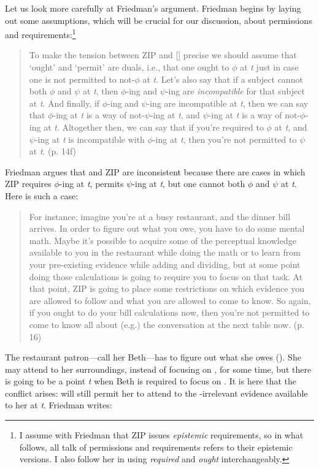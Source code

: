 \documentclass[12pt]{article}
\begin{document}
Let us look more carefully at Friedman’s argument. Friedman begins by laying out some assumptions, which will be crucial for our discussion, about permissions and requirements:\footnote{I assume with Friedman that ZIP issues \textit{epistemic} requirements, so in what follows, all talk of permissions and requirements refers to their epistemic versions. I also follow her in using \textit{required} and \textit{ought} interchangeably.}

\begin{quote}
    To make the tension between ZIP and [\ep{}] precise we should assume that `ought' and `permit' are duals, i.e., that one ought to $\phi$ at \textit{t} just in case one is not permitted to not-$\phi$ at \textit{t}. Let's also say that if a subject cannot both $\phi$ and $\psi$ at \textit{t}, then $\phi$-ing and $\psi$-ing are \textit{incompatible} for that subject at \textit{t}. And finally, if $\phi$-ing and $\psi$-ing are incompatible at \textit{t}, then we can say that $\phi$-ing at \textit{t} is a way of not-$\psi$-ing at \textit{t}, and $\psi$-ing at \textit{t} is a way of not-$\phi$-ing at \textit{t}. Altogether then, we can say that if you're required to $\phi$ at \textit{t}, and $\psi$-ing at \textit{t} is incompatible with $\phi$-ing at \textit{t}, then you're not permitted to $\psi$ at \textit{t}. (p. 14f)
\end{quote}
%
Friedman argues that \ep{} and ZIP are inconsistent because there are cases in which ZIP requires $\phi$-ing at \textit{t}, \ep{} permits $\psi$-ing at \textit{t}, but one cannot both $\phi$ and $\psi$ at \textit{t}. Here is such a case:

\begin{quote}
    For instance, imagine you're at a busy restaurant, and the dinner bill arrives. In order to figure out what you owe, you have to do some mental math. Maybe it’s possible to acquire some of the perceptual knowledge available to you in the restaurant while doing the math or to learn from your pre-existing evidence while adding and dividing, but at some point doing those calculations is going to require you to focus on that task. At that point, ZIP is going to place some restrictions on which evidence you are allowed to follow and what you are allowed to come to know. So again, if you ought to do your bill calculations now, then you’re not permitted to come to know all about (e.g.) the conversation at the next table now. (p. 16)
\end{quote}
%
The restaurant patron---call her Beth---has to figure out what she owes (). She may attend to her surroundings, instead of focusing on , for some time, but there is going to be a point \textit{t} when Beth is required to focus on . It is here that the conflict arises: \ep{} will still permit her to attend to the -irrelevant evidence available to her at \textit{t}. Friedman writes:
\end{document}

